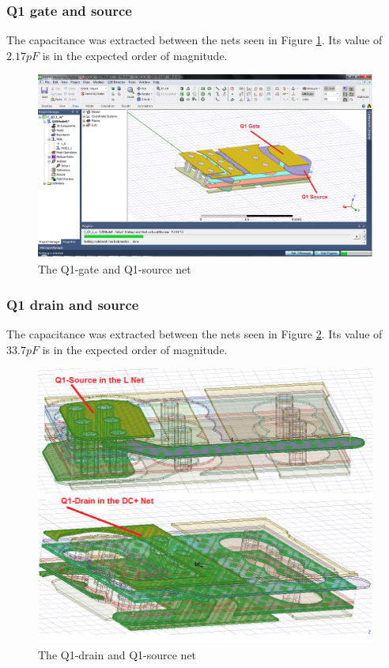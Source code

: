 \subsubsection{Q1 gate and source}
\label{sec:q1_gate_source}

The capacitance was extracted between the nets seen in Figure \ref{fig:cap_q1_g_s}. Its value of $2.17 pF$ is in the expected order of magnitude.

\begin{figure}[H]
	\centering
	\includegraphics[width=\textwidth]{pictures/implementation/cap/cap_q1_g_s.PNG}
	\caption{The Q1-gate and Q1-source net}
	\label{fig:cap_q1_g_s}
\end{figure}

\subsubsection{Q1 drain and source}
\label{sec:q1_drain_source}

The capacitance was extracted between the nets seen in Figure \ref{fig:cap_q1_d_s}. Its value of $33.7 pF$ is in the expected order of magnitude.

\begin{figure}[H]
	\centering
	\includegraphics[width=\textwidth]{pictures/implementation/cap/cap_q1_d_s.PNG}
	\caption{The Q1-drain and Q1-source net}
	\label{fig:cap_q1_d_s}
\end{figure}

